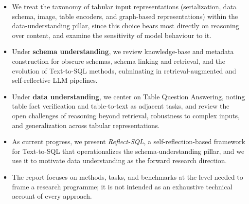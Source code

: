 \begin{itemize}
    \item We treat the taxonomy of tabular input representations (serialization, data schema, image, table encoders, and graph-based representations) within the data-understanding pillar, since this choice bears most directly on reasoning over content, and examine the sensitivity of model behaviour to it.

    \item Under \textbf{schema understanding}, we review knowledge-base and metadata construction for obscure schemas, schema linking and retrieval, and the evolution of Text-to-SQL methods, culminating in retrieval-augmented and self-reflective LLM pipelines.

    \item Under \textbf{data understanding}, we center on Table Question Answering, noting table fact verification and table-to-text as adjacent tasks, and review the open challenges of reasoning beyond retrieval, robustness to complex inputs, and generalization across tabular representations.

    \item As current progress, we present \emph{Reflect-SQL}, a self-reflection-based framework for Text-to-SQL that operationalizes the schema-understanding pillar, and we use it to motivate data understanding as the forward research direction.

    \item The report focuses on methods, tasks, and benchmarks at the level needed to frame a research programme; it is not intended as an exhaustive technical account of every approach.
\end{itemize}

